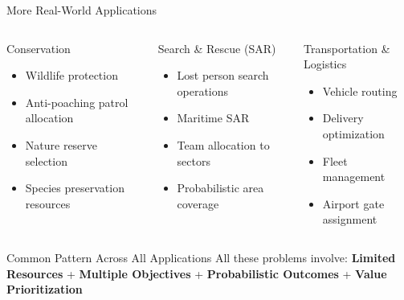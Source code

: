 \documentclass[aspectratio=43,8pt]{beamer}
\begin{document}
\begin{frame}{More Real-World Applications}
\begin{columns}[t]
\begin{block}{Conservation}
\begin{itemize}
    \item Wildlife protection
    \item Anti-poaching patrol allocation
    \item Nature reserve selection
    \item Species preservation resources
\end{itemize}
\end{block}

\begin{alertblock}{Search \& Rescue (SAR)}
\begin{itemize}
    \item Lost person search operations
    \item Maritime SAR
    \item Team allocation to sectors
    \item Probabilistic area coverage
\end{itemize}
\end{alertblock}

\begin{exampleblock}{Transportation \& Logistics}
\begin{itemize}
    \item Vehicle routing
    \item Delivery optimization
    \item Fleet management
    \item Airport gate assignment
\end{itemize}
\end{exampleblock}
\end{columns}

\vspace{0.5cm}
\begin{block}{Common Pattern Across All Applications}
All these problems involve: \textbf{Limited Resources} + \textbf{Multiple Objectives} + \textbf{Probabilistic Outcomes} + \textbf{Value Prioritization}
\end{block}
\end{frame}
\end{document}
